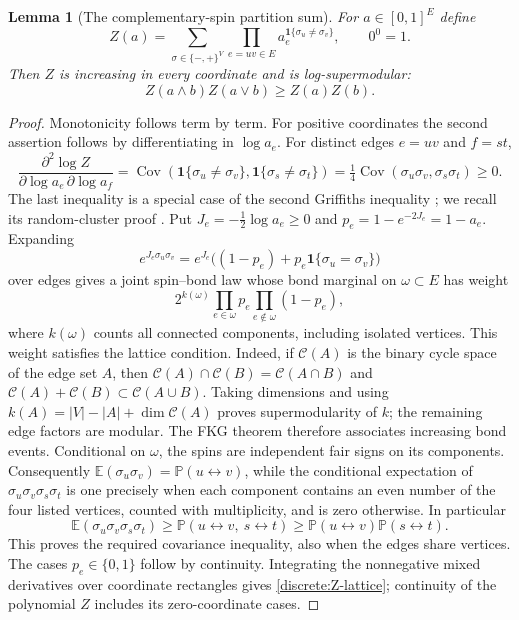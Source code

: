 \documentclass[11pt]{article}
\newcommand{\E}{\mathbb E}
\newcommand{\Prob}{\mathbb P}
\newcommand{\ind}{\mathbf 1}
\DeclareMathOperator{\Cov}{Cov}
\newtheorem{lemma}[theorem]{Lemma}
\theoremstyle{definition}
\theoremstyle{remark}
\numberwithin{equation}{section}
\begin{document}
\begin{lemma}[The complementary-spin partition sum]
\label{discrete:ising-partition}
For $a\in[0,1]^E$ define
\begin{equation}\label{discrete:ising-Z}
 Z(a)=\sum_{\sigma\in\{-,+\}^{V}}
             \prod_{e=uv\in E}a_e^{\ind\{\sigma_u\ne\sigma_v\}},
 \qquad 0^0=1.
\end{equation}
Then $Z$ is increasing in every coordinate and is log-supermodular:
\begin{equation}\label{discrete:Z-lattice}
 Z(a\wedge b)Z(a\vee b)\ge Z(a)Z(b).
\end{equation}
\end{lemma}
\begin{proof}
Monotonicity follows term by term.  For positive coordinates the second assertion follows by differentiating in $\log a_e$.
For distinct edges $e=uv$ and $f=st$,
\[
 \frac{\partial^2\log Z}{\partial\log a_e\,\partial\log a_f}
 =\Cov(\ind\{\sigma_u\ne\sigma_v\},
              \ind\{\sigma_s\ne\sigma_t\})
 =\tfrac14\Cov(\sigma_u\sigma_v,\sigma_s\sigma_t)\ge0.
\]
The last inequality is a special case of the second Griffiths inequality
\cite{GKS1968}; we recall its random-cluster proof \cite[p.~102]{FKG1971}. Put
$J_e=-\frac12\log a_e\ge0$ and $p_e=1-e^{-2J_e}=1-a_e$. Expanding
\[
 e^{J_e\sigma_u\sigma_v}
 =e^{J_e}\bigl((1-p_e)+p_e\ind\{\sigma_u=\sigma_v\}\bigr)
\]
over edges gives a joint spin--bond law whose bond marginal on
$\omega\subset E$ has weight
\[
 2^{k(\omega)}\prod_{e\in\omega}p_e
                    \prod_{e\notin\omega}(1-p_e),
\]
where $k(\omega)$ counts all connected components, including isolated
vertices. This weight satisfies the lattice condition. Indeed, if
$\mathcal C(A)$ is the binary cycle space of the edge set $A$, then
$\mathcal C(A)\cap\mathcal C(B)=\mathcal C(A\cap B)$ and
$\mathcal C(A)+\mathcal C(B)\subset\mathcal C(A\cup B)$.
Taking dimensions and using
$k(A)=|V|-|A|+\dim\mathcal C(A)$ proves supermodularity of $k$;
the remaining edge factors are modular. The FKG theorem
\cite{FKG1971} therefore associates increasing bond events.
Conditional on $\omega$, the spins are independent fair signs on its
components. Consequently
$\E(\sigma_u\sigma_v)=\Prob(u\leftrightarrow v)$, while the
conditional expectation of $\sigma_u\sigma_v\sigma_s\sigma_t$ is
one precisely when each component contains an even number of the four
listed vertices, counted with multiplicity, and is zero otherwise. In
particular
\[
 \E(\sigma_u\sigma_v\sigma_s\sigma_t)
 \ge\Prob(u\leftrightarrow v,\ s\leftrightarrow t)
 \ge\Prob(u\leftrightarrow v)\Prob(s\leftrightarrow t).
\]
This proves the required covariance inequality, also when the edges share
vertices. The cases $p_e\in\{0,1\}$ follow by continuity. Integrating
the nonnegative mixed derivatives over coordinate rectangles gives
\eqref{discrete:Z-lattice}; continuity of the polynomial $Z$ includes its
zero-coordinate cases.

\end{proof}
\end{document}
